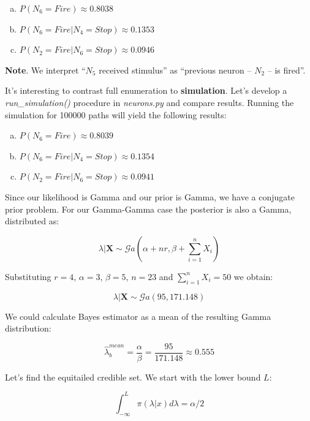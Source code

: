 \documentclass[a4 paper]{article}
\begin{document}
\begin{enumerate}[a)]
	\item $P(N_6=Fire) \approx 0.8038$
	\item $P(N_6=Fire|N_4=Stop) \approx 0.1353$
	\item $P(N_2=Fire|N_6=Stop) \approx 0.0946$
\end{enumerate}

\textbf{Note}. We interpret ``$N_5$ received stimulus''
as ``previous neuron -- $N_2$ -- is fired''. \newline


It's interesting to contrast 
full enumeration to \textbf{simulation}.
Let's develop a \textit{run\_simulation()}
procedure in \textit{neurons.py} 
and compare results. Running
the simulation for 100000 paths
will yield the following results:

\begin{enumerate}[a)]
	\item $P(N_6=Fire) \approx 0.8039$
	\item $P(N_6=Fire|N_4=Stop) \approx 0.1354$
	\item $P(N_2=Fire|N_6=Stop) \approx 0.0941$
\end{enumerate}








Since our likelihood is Gamma and
our prior is Gamma, we have a 
conjugate prior problem.
For our Gamma-Gamma case 
the posterior is
also a Gamma, distributed as:

$$
\lambda|\mathbf{X}\sim\mathcal{G}a\left(\alpha+nr,\beta+\sum_{i=1}^{n}X_{i}\right)
$$

Substituting $r=4$, $\alpha=3$, $\beta=5$,
$n=23$ and $\sum_{i=1}^{n}X_{i}=50$ 
we obtain:

$$
\lambda|\mathbf{X}\sim\mathcal{G}a\left(95,171.148\right)
$$

We could calculate Bayes 
estimator as a mean of the resulting
Gamma distribution:

$$
\hat{\lambda}_{b}^{mean}=\frac{\alpha}{\beta}=\frac{95}{171.148}\approx0.555
$$

Let's find the equitailed credible set.
We start with the lower bound $L$:

$$
\int_{-\infty}^{L} \pi(\lambda | x) d \lambda=\alpha / 2
$$
\end{document}
